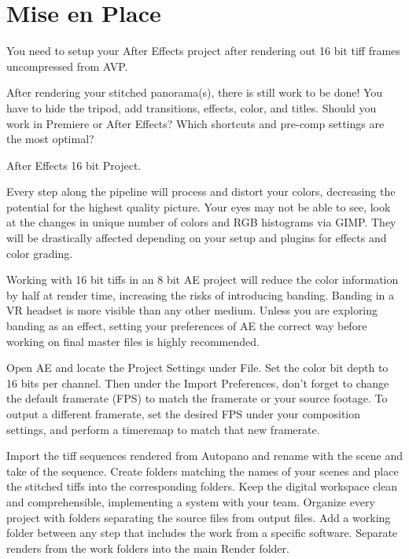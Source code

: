 \chapter{Mise en Place}
\pagecolor{white}
\label{chap:47}
\begin{fullwidth}

\problem

{\large You need to setup your After Effects project after rendering out 16 bit tiff frames uncompressed from AVP. \par}

After rendering your stitched panorama(s), there is still work to be done! You have to hide the tripod, add transitions, effects, color, and titles. Should you work in Premiere or After Effects? Which shortcuts and pre-comp settings are the most optimal?

\solutions

{\large After Effects 16 bit Project. \par}

Every step along the pipeline will process and distort your colors, decreasing the potential for the highest quality picture. Your eyes may not be able to see, look at the changes in unique number of colors and RGB histograms via GIMP. They will be drastically affected depending on your setup and plugins for effects and color grading.


Working with 16 bit tiffs in an 8 bit AE project will reduce the color information by half at render time, increasing the risks of introducing banding. Banding in a VR headset is more visible than any other medium. Unless you are exploring banding as an effect, setting your preferences of AE the correct way before working on final master files is highly recommended. 

Open AE and locate the Project Settings under File. Set the color bit depth to 16 bits per channel. Then under the Import Preferences, don't forget to change the default framerate (FPS) to match the framerate or your source footage. To output a different framerate, set the desired FPS under your composition settings, and perform a timeremap to match that new framerate.


Import the tiff sequences rendered from Autopano and rename with the scene and take of the sequence. Create folders matching the names of your scenes and place the stitched tiffs into the corresponding folders. Keep the digital workspace clean and comprehensible, implementing a system with your team. Organize every project with folders separating the source files from output files. Add a working folder between any step that includes the work from a specific software. Separate renders from the work folders into the main Render folder. 


\end{fullwidth}
